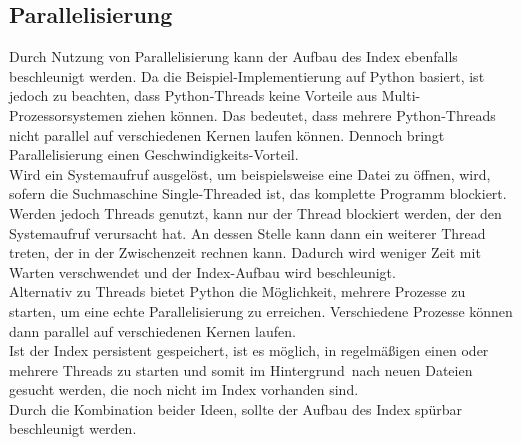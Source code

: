 \subsection{Parallelisierung}
Durch Nutzung von Parallelisierung kann der Aufbau des Index ebenfalls beschleunigt werden. Da die Beispiel-Implementierung auf Python basiert, ist jedoch zu beachten, dass Python-Threads keine Vorteile aus Multi-Prozessorsystemen ziehen können. Das bedeutet, dass mehrere Python-Threads nicht parallel auf verschiedenen Kernen laufen können. Dennoch bringt Parallelisierung einen Geschwindigkeits-Vorteil.
\\
Wird ein Systemaufruf ausgelöst, um beispielsweise eine Datei zu öffnen, wird, sofern die Suchmaschine Single-Threaded ist, das komplette Programm blockiert. Werden jedoch Threads genutzt, kann nur der Thread blockiert werden, der den Systemaufruf verursacht hat. An dessen Stelle kann dann ein weiterer Thread treten, der in der Zwischenzeit rechnen kann. Dadurch wird weniger Zeit mit Warten verschwendet und der Index-Aufbau wird beschleunigt. 
\\
Alternativ zu Threads bietet Python die Möglichkeit, mehrere Prozesse zu starten, um eine echte Parallelisierung zu erreichen. Verschiedene Prozesse können dann parallel auf verschiedenen Kernen laufen. \\
Ist der Index persistent gespeichert, ist es möglich, in regelmäßigen einen oder mehrere Threads zu starten und somit \glqq im Hintergrund\grqq\ nach neuen Dateien gesucht werden, die noch nicht im Index vorhanden sind. 
\\
Durch die Kombination beider Ideen, sollte der Aufbau des Index spürbar beschleunigt werden.


